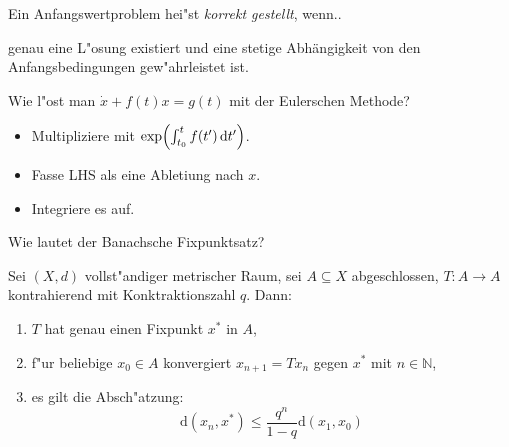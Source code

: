 \documentclass[9pt]{article}
\newenvironment{field}{}{\newpage}
\newif\ifnote
\newenvironment{note}{\notetrue}{\notefalse}
\newcommand{\localtag}{}
\newcommand{\globaltag}{}
\newcommand{\uuid}{}
\newcommand{\tags}[1]{
    \ifnote 
        \renewcommand{\localtag}{#1}
    \else
        \renewcommand{\globaltag}{#1}
    \fi 
    }
\newcommand{\xplain}[1]{\renewcommand{\uuid}{#1}}
\begin{document}
\begin{note}
	\xplain{UUID}  %
	\tags{definition, 3.1.3}
	
	\begin{field}  %
		Ein Anfangswertproblem  hei"st \textit{korrekt gestellt}, wenn..
	\end{field}  
	
	\begin{field}  %
		genau eine L"osung existiert und eine stetige Abhängigkeit von den Anfangsbedingungen gew"ahrleistet ist. 
	\end{field}
\end{note}

\begin{note}
	\xplain{UUID}  %
	\tags{GDGL, methode, 3.2.7.1}
	
	\begin{field}  %
		Wie l"ost man $\dot{x} + f(t)x = g(t)$ mit der Eulerschen Methode? 
	\end{field}  
	
	\begin{field}  %
		\begin{itemize}
			\item Multipliziere mit $\exp(\int_{t_0}^{t}f(t') \dif t')$.
			\item Fasse LHS als eine Abletiung nach $x$.
			\item Integriere es auf.
		\end{itemize}
	\end{field}
\end{note}

\begin{note}
	\xplain{UUID}  %
	\tags{satz, 3.3 , fixpunkt}
	
	\begin{field}  %
		Wie lautet der Banachsche Fixpunktsatz?
	\end{field}  
	
	\begin{field}  %
		Sei $(X,d)$ vollst"andiger metrischer Raum, sei $A \subseteq X$ abgeschlossen,
		$T: A \rightarrow A$ kontrahierend mit Konktraktionszahl $q$. Dann:
		\begin{enumerate}
			\item $T$ hat genau einen Fixpunkt $x^*$ in $A$,
			\item f"ur beliebige $x_0 \in A$ konvergiert $x_{n+1} = T{x_n}$ gegen $x^*$ mit $n \in \mathbb{N}$,
			\item es gilt die Absch"atzung:
			\begin{equation*}
				\mathrm{d} (x_n,x^*) \leq \frac{q^n}{1-q}\mathrm{d}(x_1,x_0)
			\end{equation*} 
		\end{enumerate}
	\end{field}
\end{note}
\end{document}
